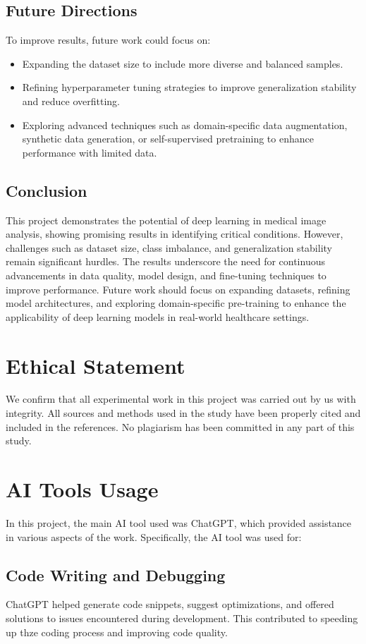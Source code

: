 \documentclass[journal]{IEEEtran}
\begin{document}
\subsection{Future Directions}
To improve results, future work could focus on:
\begin{itemize}
\item Expanding the dataset size to include more diverse and balanced samples.
\item Refining hyperparameter tuning strategies to improve generalization stability and reduce overfitting.
\item Exploring advanced techniques such as domain-specific data augmentation, synthetic data generation, or self-supervised pretraining to enhance performance with limited data.
\end{itemize}

\subsection{Conclusion}
This project demonstrates the potential of deep learning in medical image analysis, showing promising results in identifying critical conditions. However, challenges such as dataset size, class imbalance, and generalization stability remain significant hurdles. The results underscore the need for continuous advancements in data quality, model design, and fine-tuning techniques to improve performance. Future work should focus on expanding datasets, refining model architectures, and exploring domain-specific pre-training to enhance the applicability of deep learning models in real-world healthcare settings.


\section{Ethical Statement}
We confirm that all experimental work in this project was carried out by us with integrity. All sources and methods used in the study have been properly cited and included in the references. No plagiarism has been committed in any part of this study.
\section{AI Tools Usage}

In this project, the main AI tool used was ChatGPT\cite{chatgpt}, which provided assistance in various aspects of the work. Specifically, the AI tool was used for:

\subsection{Code Writing and Debugging} ChatGPT helped generate code snippets, suggest optimizations, and offered solutions to issues encountered during development. This contributed to speeding up thze coding process and improving code quality.
    
\end{document}

